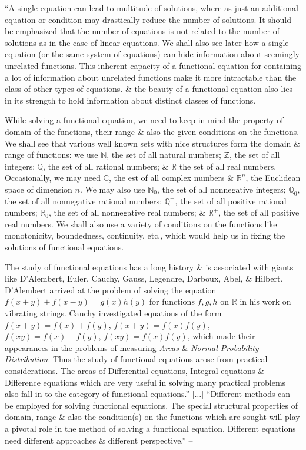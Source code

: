 \documentclass{article}
\begin{document}
``A single equation can lead to multitude of solutions, where as just an additional equation or condition may drastically reduce the number of solutions. It should be emphasized that the number of equations is not related to the number of solutions as in the case of linear equations. We shall also see later how a single equation (or the same system of equations) can hide information about seemingly unrelated functions. This inherent capacity of a functional equation for containing a lot of information about unrelated functions make it more intractable than the class of other types of equations. \& the beauty of a functional equation also lies in its strength to hold information about distinct classes of functions.

While solving a functional equation, we need to keep in mind the property of domain of the functions, their range \& also the given conditions on the functions. We shall see that various well known sets with nice structures form the domain \& range of functions: we use $\mathbb{N}$, the set of all natural numbers; $\mathbb{Z}$, the set of all integers; $\mathbb{Q}$, the set of all rational numbers; \& $\mathbb{R}$ the set of all real numbers. Occasionally, we may need $\mathbb{C}$, the est of all complex numbers \& $\mathbb{R}^n$, the Euclidean space of dimension $n$. We may also use $\mathbb{N}_0$, the set of all nonnegative integers; $\mathbb{Q}_0$, the set of all nonnegative rational numbers; $\mathbb{Q}^+$, the set of all positive rational numbers; $\mathbb{R}_0$, the set of all nonnegative real numbers; \& $\mathbb{R}^+$, the set of all positive real numbers. We shall also use a variety of conditions on the functions like monotonicity, boundedness, continuity, etc., which would help us in fixing the solutions of functional equations.

The study of functional equations has a long history \& is associated with giants like D'Alembert, Euler, Cauchy, Gauss, Legendre, Darboux, Abel, \& Hilbert. D'Alembert arrived at the problem of solving the equation $f(x + y) + f(x - y) = g(x)h(y)$ for functions $f,g,h$ on $\mathbb{R}$ in his work on vibrating strings. Cauchy investigated equations of the form $f(x + y) = f(x) + f(y)$, $f(x + y) = f(x)f(y)$, $f(xy) = f(x) + f(y)$, $f(xy) = f(x)f(y)$, which made their appearances in the problems of measuring \textit{Areas} \& \textit{Normal Probability Distribution}. Thus the study of functional equations arose from practical considerations. The areas of Differential equations, Integral equations \& Difference equations which are very useful in solving many practical problems also fall in to the category of functional equations.'' [$\ldots$] ``Different methods can be employed for solving functional equations. The special structural properties of domain, range \& also the condition(s) on the functions which are sought will play a pivotal role in the method of solving a functional equation. Different equations need different approaches \& different perspective.'' -- \cite[pp. 3--4]{Venkatachala2013}
\end{document}
